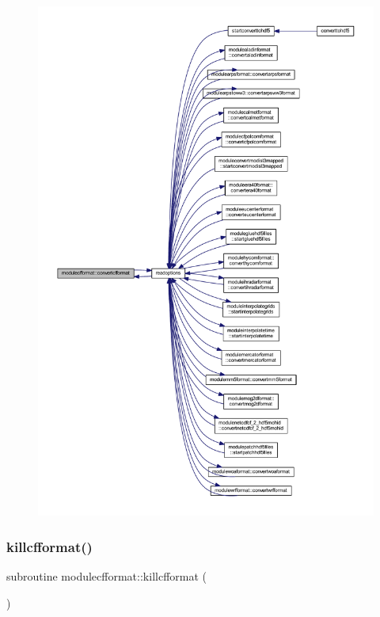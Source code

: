 \begin{figure}[H]
\begin{center}
\leavevmode
\includegraphics[width=350pt]{namespacemodulecfformat_a66da5c204d14d5f914e0226b731d5b00_icgraph}
\end{center}
\end{figure}
\mbox{\label{namespacemodulecfformat_ac518bd16572e1cf72041996bfd3d1e36}} 
\subsubsection{\texorpdfstring{killcfformat()}{killcfformat()}}
{\footnotesize\ttfamily subroutine modulecfformat\+::killcfformat (\begin{DoxyParamCaption}{ }\end{DoxyParamCaption})\hspace{0.3cm}{\ttfamily [private]}}

